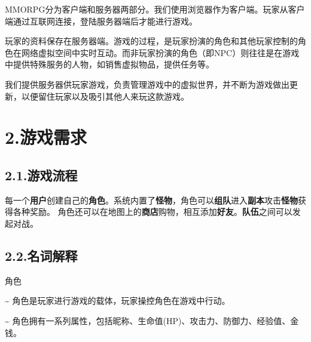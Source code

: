 \documentclass{article}
\begin{document}
\noindent{}MMORPG分为客户端和服务器两部分。我们使用浏览器作为客户端。玩家从客户端通过互联网连接，登陆服务器端后才能进行游戏。%

玩家的资料保存在服务器端。游戏的过程，是玩家扮演的角色和其他玩家控制的角色在网络虚拟空间中实时互动。而非玩家扮演的角色（即NPC）则往往是在游戏中提供特殊服务的人物，如销售虚拟物品，提供任务等。%

我们提供服务器供玩家游戏，负责管理游戏中的虚拟世界，并不断为游戏做出更新，以便留住玩家以及吸引其他人来玩这款游戏。%

\section{2.\hspace*{0.5em}游戏需求}\label{2}%

\subsection{2.1.\hspace*{0.5em}游戏流程}\label{21}%

\noindent{}每一个\textbf{用户}创建自己的\textbf{角色}。系统内置了\textbf{怪物}，角色可以\textbf{组队}进入\textbf{副本}攻击\textbf{怪物}获得各种奖励。 角色还可以在地图上的\textbf{商店}购物，相互添加\textbf{好友}。\textbf{队伍}之间可以发起对战。%

\subsection{2.2.\hspace*{0.5em}名词解释}\label{22}%

\noindent{} 角色%

  \textasciitilde{} 角色是玩家进行游戏的载体，玩家操控角色在游戏中行动。%

  \textasciitilde{} 角色拥有一系列属性，包括昵称、生命值(HP)、攻击力、防御力、经验值、金钱。%
\end{document}
